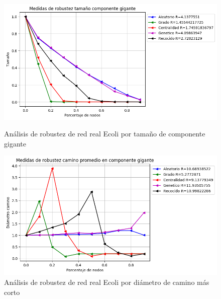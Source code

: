 \begin{figure}[!htb]
    \begin{minipage}{0.48\textwidth}
        \centering
        \includegraphics[scale=0.4]{CapituloAAnexos/imagenesAnexoC/Robustez/grafica_GC20180506_091444EColi}
        \caption{Análisis de robustez de red real Ecoli por tamaño de componente gigante}
    \end{minipage}\hfill
   \begin{minipage}{0.48\textwidth}
         \centering
       \includegraphics[scale=0.4]{CapituloAAnexos/imagenesAnexoC/Robustez/grafica_APL20180506_091444EColi}
        \caption{Análisis de robustez de red real Ecoli por diámetro de camino más corto}
    \end{minipage}
\end{figure}


